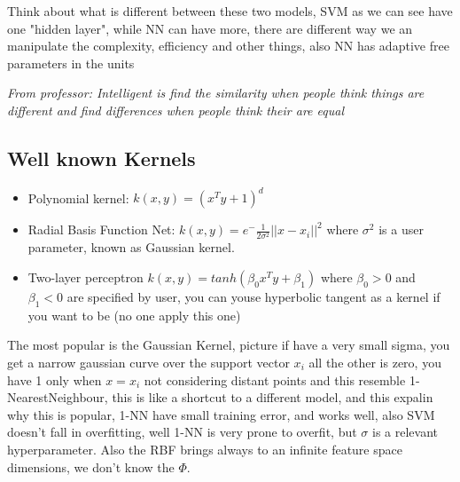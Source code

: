 \documentclass[12pt]{book}
\begin{document}
Think about what is different between these two models, SVM as we can see have one "hidden layer", while NN can have more, there are different way we an manipulate the complexity, efficiency and other things, also NN has adaptive free parameters in the units

\textit{From professor: Intelligent is find the similarity when people think things are different and find differences when people think their are equal}

\subsection{Well known Kernels}

\begin{itemize}
	\item Polynomial kernel: $k(x,y) = (x^Ty + 1)^d$
	\item Radial Basis Function Net: $k(x,y) = e^-{\frac{1}{2\sigma^2}}||x-x_i||^2$ where $\sigma^2$ is a user parameter, known as Gaussian kernel.
	\item Two-layer perceptron $k(x,y) = tanh(\beta_0x^Ty + \beta_1)$ where $\beta_0 > 0$ and $\beta_1 < 0$ are specified by user, you can youse hyperbolic tangent as a kernel if you want to be (no one apply this one)
\end{itemize}
The most popular is the Gaussian Kernel, picture if have a very small sigma, you get a narrow gaussian curve over the support vector $x_i$ all the other is zero, you have 1 only when $x = x_i$ not considering distant points and this resemble 1-NearestNeighbour, this is like a shortcut to a different model, and this expalin why this is popular, 1-NN have small training error, and works well, also SVM doesn't fall in overfitting, well 1-NN is very prone to overfit, but $\sigma$ is a relevant hyperparameter. Also the RBF brings always to an infinite feature space dimensions, we don't know the $\Phi$.
\end{document}
